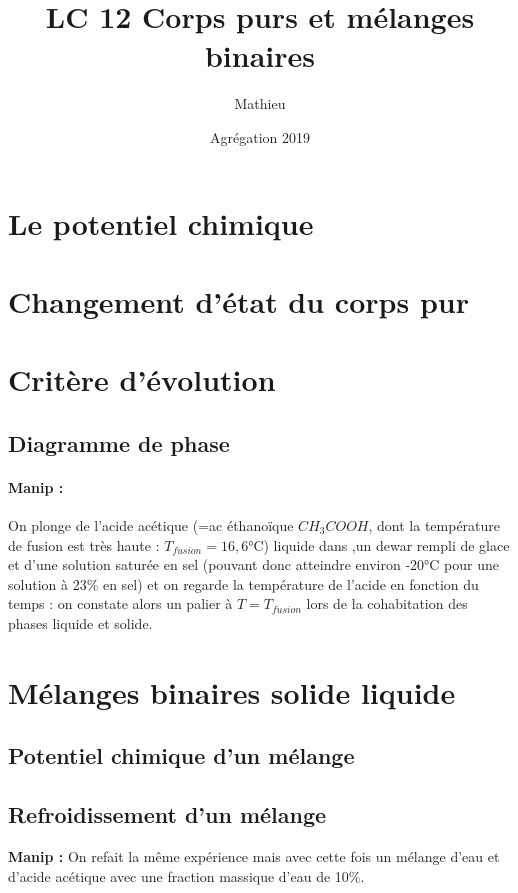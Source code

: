 \documentclass[12pt,prb,aps,epsf]{article}
\begin{document}
	
	\title{LC 12 Corps purs et mélanges binaires}
	\author{Mathieu}
	\date{Agrégation 2019}
	
	\maketitle
	
	\tableofcontents
	
	\pagebreak
	
\section{Le potentiel chimique}
\section{Changement d'état du corps pur}
\section{Critère d'évolution}
\subsection{Diagramme de phase}
\paragraph{Manip :}  On plonge de l'acide acétique (=ac éthanoïque $CH_3COOH$, dont la température de fusion est très haute : $T_{fusion} = 16,6$°C) liquide dans ,un dewar rempli de glace et d'une solution saturée en sel (pouvant donc atteindre environ -20°C pour une solution à 23\% en sel) et on regarde la température de l'acide en fonction du temps : on constate alors un palier à $T=T_{fusion}$ lors de la cohabitation des phases liquide et solide.

\section{Mélanges binaires solide liquide}
\subsection{Potentiel chimique d'un mélange}
\subsection{Refroidissement d'un mélange}
\textbf{Manip :} On refait la même expérience mais avec cette fois un mélange d'eau et d'acide acétique avec une fraction massique d'eau de 10\%.
\end{document}
